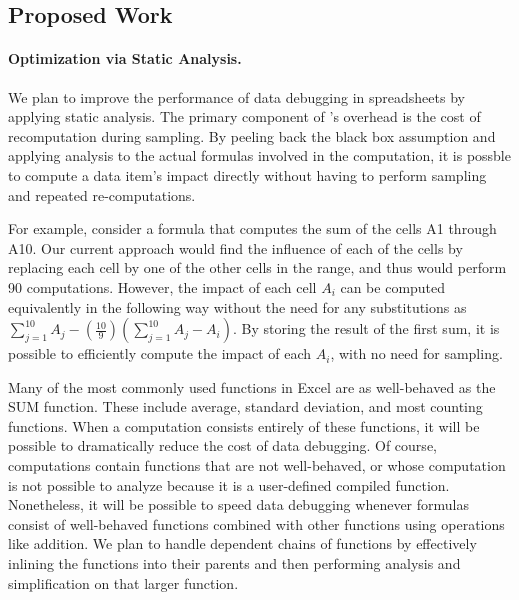 \subsection{Proposed Work}

\paragraph{Optimization via Static Analysis.} We plan to improve the performance of data debugging in spreadsheets
by applying static analysis. The primary component of \checkcell{}'s
overhead is the cost of recomputation during sampling. By peeling back
the black box assumption and applying analysis to the actual formulas
involved in the computation, it is possble to compute a data item's
impact directly without having to perform sampling and repeated
re-computations.

For example, consider a formula that computes the sum of the cells A1
through A10. Our current approach would find the influence of each of
the cells by replacing each cell by one of the other cells in the
range, and thus would perform 90 computations. However, the impact of
each cell $A_i$ can be computed equivalently in the following way
without the need for any substitutions as $\sum_{j=1}^{10}{A_j} -
(\frac{10}{9})(\sum_{j=1}^{10}{A_j} - A_i)$.  By storing the result of the first
sum, it is possible to efficiently compute the impact of each $A_i$,
with no need for sampling.

Many of the most commonly used functions in Excel are as well-behaved
as the SUM function. These include average, standard deviation, and
most counting functions. When a computation consists entirely of these
functions, it will be possible to dramatically reduce the cost of data
debugging. Of course, computations contain functions that are not
well-behaved, or whose computation is not possible to analyze because
it is a user-defined compiled function. Nonetheless, it will be
possible to speed data debugging whenever formulas consist of
well-behaved functions combined with other functions using operations
like addition. We plan to handle dependent chains of functions by
effectively inlining the functions into their parents and then performing
analysis and simplification on that larger function.

